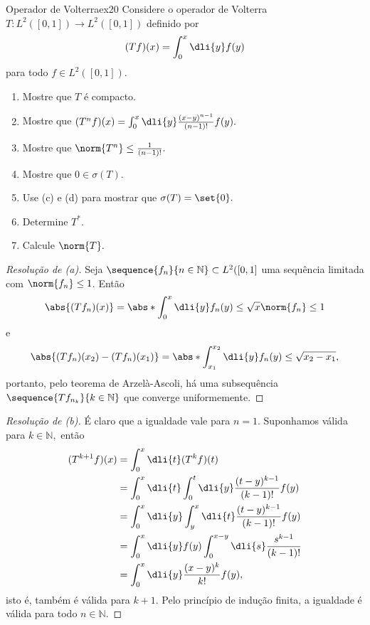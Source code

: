 \begin{exercício}{Operador de Volterra}{ex20}
  Considere o operador de Volterra \(T : L^2([0,1]) \to L^2([0,1])\) definido por
  \begin{equation*}
    (Tf)(x) = \int_0^x \dli{y}f(y)
  \end{equation*}
  para todo \(f \in L^2([0,1]).\)
  \begin{enumerate}[label=(\alph*)]
      \item Mostre que \(T\) é compacto.
      \item Mostre que \((T^nf)(x) = \int_0^x\dli{y} \frac{(x - y)^{n-1}}{(n - 1)!}f(y).\)
      \item Mostre que \(\norm{T^n} \leq \frac{1}{(n - 1)!}.\)
      \item Mostre que \(0 \in \sigma(T).\)
      \item Use (c) e (d) para mostrar que \(\sigma(T) = \set{0}.\)
      \item Determine \(T^*.\)
      \item Calcule \(\norm{T}.\)
  \end{enumerate}
\end{exercício}
\begin{proof}[Resolução de (a)]
  Seja \(\sequence{f_n}{n\in \mathbb{N}} \subset L^2([0,1]\) uma sequência limitada com \(\norm{f_n} \leq 1\). Então
  \begin{equation*}
    \abs{(Tf_n)(x)} = \abs*{\int_0^x\dli{y} f_n(y)} \leq \sqrt{x} \norm{f_n} \leq 1
  \end{equation*}
  e
  \begin{equation*}
    \abs{(Tf_n)(x_2) - (Tf_n)(x_1)} = \abs*{\int_{x_1}^{x_2}\dli{y} f_n(y)} \leq \sqrt{x_2 - x_1},
  \end{equation*}
  portanto, pelo teorema de Arzelà-Ascoli, há uma subsequência \(\sequence{Tf_{n_k}}{k \in \mathbb{N}}\) que converge uniformemente.
\end{proof}
\begin{proof}[Resolução de (b)]
  É claro que a igualdade vale para \(n = 1.\) Suponhamos válida para \(k \in \mathbb{N},\) então
  \begin{align*}
    (T^{k+1}f)(x) &= \int_0^x \dli{t} (T^kf)(t)\\
                  &= \int_0^x \dli{t} \int_0^t \dli{y} \frac{(t - y)^{k - 1}}{(k - 1)!}f(y)\\
                  &= \int_0^x \dli{y} \int_y^x \dli{t} \frac{(t - y)^{k-1}}{(k - 1)!} f(y)\\
                  &= \int_0^x \dli{y} f(y) \int_0^{x-y} \dli{s} \frac{s^{k-1}}{(k-1)!}\\
                  &= \int_0^x \dli{y} \frac{(x - y)^k}{k!}f(y),
  \end{align*}
  isto é, também é válida para \(k + 1.\) Pelo princípio de indução finita, a igualdade é válida para todo \(n \in \mathbb{N}.\)
\end{proof}
